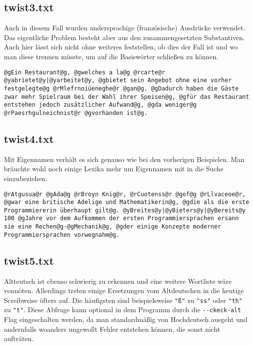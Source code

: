 \documentclass[a4paper,10pt,ngerman]{scrartcl}
\begin{document}
\vspace{1\baselineskip}
\subsection{twist3.txt}
Auch in diesem Fall wurden andersprachige (französische) Ausdrücke verwendet. Das eigentliche Problem besteht aber aus den zusammengesetzten Substantiven. Auch hier lässt sich nicht ohne weiteres feststellen, ob dies der Fall ist und wo man diese trennen müsste, um auf die Basiswörter schließen zu können.

\begin{lstlisting}
@gEin Restaurant@g, @gwelches a la@g @rcarte@r @yabrietet@y|@yarbeitet@y, @gbietet sein Angebot ohne eine vorher festgelegte@g @rMlefrnoiüeneghe@r @gan@g. @gDadurch haben die Gäste zwar mehr Spielraum bei der Wahl ihrer Speisen@g, @gfür das Restaurant entstehen jedoch zusätzlicher Aufwand@g, @gda weniger@g @rPaesrhgulneichnist@r @gvorhanden ist@g.
\end{lstlisting}

\vspace{1\baselineskip}
\subsection{twist4.txt}
Mit Eigennamen verhält es sich genauso wie bei den vorherigen Beispielen. Man bräuchte wohl noch einige Lexika mehr um Eigennamen mit in die Suche einzubeziehen.

\begin{lstlisting}
@rAtgusua@r @gAda@g @rBroyn Knig@r, @rCuotenss@r @gof@g @rLlvaceoe@r, @gwar eine britische Adelige und Mathematikerin@g, @gdie als die erste Programmiererin überhaupt gilt@g. @yBreites@y|@yBieters@y|@yBereits@y 100 @gJahre vor dem Aufkommen der ersten Programmiersprachen ersann sie eine Rechen@g-@gMechanik@g, @gder einige Konzepte moderner Programmiersprachen vorwegnahm@g.
\end{lstlisting}

\vspace{1\baselineskip}
\subsection{twist5.txt}
Altteutsch ist ebenso schwierig zu erkennen und eine weitere Wortliste wäre vonnöten. Allerdings treten einige Ersetzungen vom Altdeutschen in die heutige Screibweise öfters auf. Die häufigsten sind beispielsweise \lstinline{"ß"} zu \lstinline{"ss"} oder \lstinline{"th"} zu \lstinline{"t"}. Diese Abfrage kann optional in dem Programm durch die \lstinline{--ckeck-alt} Flag eingeschalten werden, da man standardmäßig von Hochdeutsch ausgeht und andernfalls woanders ungewollt Fehler entstehen können, die sonst nicht aufträten.
\end{document}
